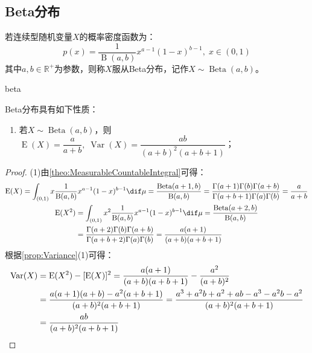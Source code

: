 \subsection{Beta分布}
\begin{definition}
	若连续型随机变量$X$的概率密度函数为：
	\begin{equation*}
		p(x)=\frac{1}{\operatorname{B}(a,b)}x^{a-1}(1-x)^{b-1},\;x\in(0,1)
	\end{equation*}
	其中$a,b\in\mathbb{R}^{+}$为参数，则称$X$服从Beta分布，记作$X\sim\operatorname{Beta}(a,b)$。
\end{definition}
\begin{densityplot}{beta}
	\caption{Beta分布 $\operatorname{Beta}(2,5)$ 的概率密度函数}
\end{densityplot}
\begin{property}
	Beta分布具有如下性质：
	\begin{enumerate}
		\item 若$X\sim\operatorname{Beta}(a,b)$，则$\operatorname{E}(X)=\dfrac{a}{a+b},\;\operatorname{Var}(X)=\dfrac{ab}{(a+b)^2(a+b+1)}$；
	\end{enumerate}
\end{property}
\begin{proof}
	(1)由\cref{theo:MeasurableCountableIntegral}可得：
	\begin{gather*}
		\operatorname{E}(X)=\int_{(0,1)}x\frac{1}{\operatorname{B}(a,b)}x^{a-1}(1-x)^{b-1}\dif\mu=\frac{\operatorname{Beta}(a+1,b)}{\operatorname{B}(a,b)}=\frac{\Gamma(a+1)\Gamma(b)\Gamma(a+b)}{\Gamma(a+b+1)\Gamma(a)\Gamma(b)}=\frac{a}{a+b} \\
		\begin{aligned}
			\operatorname{E}(X^2)&=\int_{(0,1)}x^2\frac{1}{\operatorname{B}(a,b)}x^{a-1}(1-x)^{b-1}\dif\mu=\frac{\operatorname{Beta}(a+2,b)}{\operatorname{B}(a,b)} \\
			&=\frac{\Gamma(a+2)\Gamma(b)\Gamma(a+b)}{\Gamma(a+b+2)\Gamma(a)\Gamma(b)}=\frac{a(a+1)}{(a+b)(a+b+1)}
		\end{aligned}
	\end{gather*}
	根据\cref{prop:Variance}(1)可得：
	\begin{align*}
		\operatorname{Var}(X)&=\operatorname{E}(X^2)-[\operatorname{E}(X)]^2=\frac{a(a+1)}{(a+b)(a+b+1)}-\frac{a^2}{(a+b)^2} \\
		&=\frac{a(a+1)(a+b)-a^2(a+b+1)}{(a+b)^2(a+b+1)}=\frac{a^3+a^2b+a^2+ab-a^3-a^2b-a^2}{(a+b)^2(a+b+1)} \\
		&=\frac{ab}{(a+b)^2(a+b+1)}\qedhere
	\end{align*}
\end{proof}

